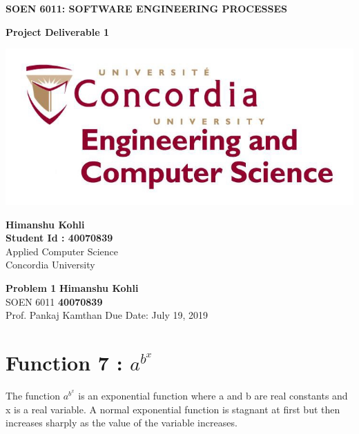 \documentclass[a4paper, 11pt]{article}
\begin{document}
\begin{titlepage}
   \begin{center}
       \vspace*{1cm}
 
       \textbf{\huge{SOEN 6011: SOFTWARE ENGINEERING PROCESSES}}
 
       \vspace{0.5cm}
        \textbf{\huge{Project Deliverable 1}}
 
       \vspace{1.0cm}
       \vskip 1.4in
    \includegraphics[width=1.0\textwidth]{Concordia.jpg}
       
       \vskip 1.4in
 
       \vspace{0.8cm}
       
        \textbf{Himanshu Kohli}\\
        \textbf{Student Id : 40070839}\\
       Applied Computer Science\\
       Concordia University\\
       
 
   \end{center}
\end{titlepage}
\newpage
\noindent
\large\textbf{Problem 1} \hfill \textbf{Himanshu Kohli} \\
\normalsize SOEN 6011 \hfill \textbf{40070839} \\
Prof. Pankaj Kamthan \hfill Due Date: July 19, 2019 \\


\section{Function 7 :  $a^{b^{x}}$}

The function $a^{b^{x}}$ is an exponential function where a and b are real constants and x is a real variable. A normal exponential function is stagnant at first but then increases sharply as the value of the variable increases. \\
\end{document}
